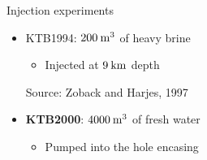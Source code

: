 \documentclass[14pt]{beamer}
\begin{document}
\begin{frame}{Injection experiments}
 \begin{itemize}
  \item KTB1994: $200\:\mathrm{m^3}$ of heavy brine
    \begin{itemize}
     \item Injected at $9\:\mathrm{km}$ depth
    \end{itemize}
        {\tiny Source: Zoback and Harjes, 1997}
    \pause
  \item \textbf{KTB2000}: $4000\:\mathrm{m^3}$ of fresh water
    \begin{itemize}
     \item Pumped into the hole encasing
         \pause

\end{itemize}
\end{itemize}
\end{frame}
\end{document}
